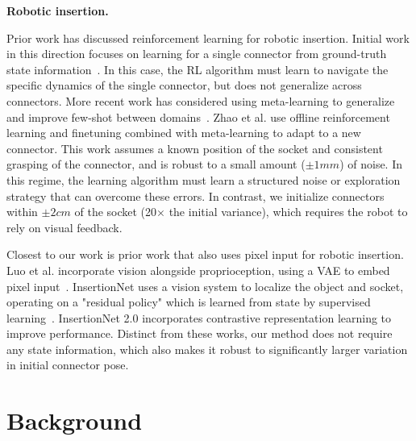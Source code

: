 \documentclass{article}
\begin{document}
\textbf{Robotic insertion.}

Prior work has discussed reinforcement learning for robotic insertion.
Initial work in this direction focuses on learning
for a single connector from ground-truth state information~\cite{lian2021insertionbenchmark, johannink18residualrl, schoettler2019insertion}.
In this case, the RL algorithm must learn to navigate the specific dynamics of the single connector, but does not generalize across connectors.
More recent work has considered using meta-learning to generalize and improve few-shot between domains~\cite{Schoettler2020}.
Zhao et al.
use offline reinforcement learning and finetuning combined with  meta-learning to adapt to a new connector.
This work assumes a known position of the socket and consistent grasping of the connector, and is robust to a small amount ($\pm1mm$) of noise.
In this regime, the learning algorithm must learn a structured noise or exploration strategy that can overcome these errors.
In contrast, we initialize connectors within $\pm2cm$ of the socket (20$\times$ the initial variance), which requires the robot to rely on visual feedback.

Closest to our work is prior work that also uses pixel input for robotic insertion.
Luo et al. incorporate vision alongside proprioception, using a VAE to embed pixel input~\cite{luo2021insertion}.
InsertionNet uses a vision system to localize the object and socket, operating on a "residual policy" which is learned from state by supervised learning~\cite{spector2021insertionnet}.
InsertionNet 2.0 incorporates contrastive representation learning to improve performance.
Distinct from these works, our method does not require any state information, which also makes it robust to significantly larger variation in initial connector pose.

\section{Background}
\end{document}

